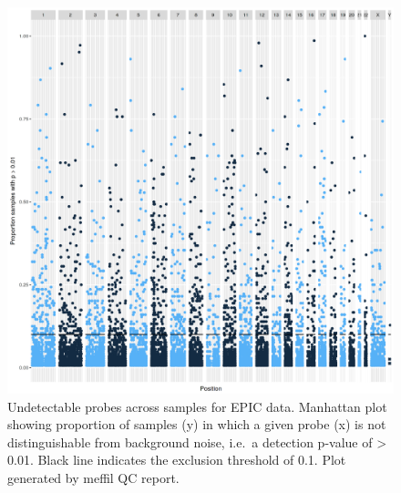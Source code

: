 \documentclass[
]{book}
\begin{document}
\begin{figure}

{\centering \includegraphics[width=0.8\linewidth]{figs/MAVIDOSqcEPICpropSamples} 

}

\caption{Undetectable probes across samples for EPIC data. Manhattan plot showing proportion of samples (y) in which a given probe (x) is not distinguishable from background noise, i.e.~a detection p-value of \textgreater{} 0.01. Black line indicates the exclusion threshold of 0.1. Plot generated by meffil QC report.}\label{fig:MAVIDOSqcEPICpropSamples}
\end{figure}
\end{document}
